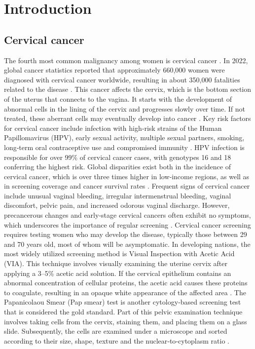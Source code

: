 \documentclass[final,5p,times,twocolumn,authoryear]{elsarticle}
\begin{document}
\section{Introduction}
\subsection{Cervical cancer}
The fourth most common malignancy among women is cervical cancer \cite{ref1}. In 2022, global cancer statistics reported that approximately 660,000 women were diagnosed with cervical cancer worldwide, resulting in about 350,000 fatalities related to the disease \cite{ref2}. This cancer affects the cervix, which is the bottom section of the uterus that connects to the vagina. It starts with the development of abnormal cells in the lining of the cervix and progresses slowly over time. If not treated, these aberrant cells may eventually develop into cancer \cite{ref3}. Key risk factors for cervical cancer include infection with high‑risk strains of the Human Papillomavirus (HPV), early sexual activity, multiple sexual partners, smoking, long‑term oral contraceptive use and compromised immunity \cite{ref4}. HPV infection is responsible for over 99\% of cervical cancer cases, with genotypes 16 and 18 conferring the highest risk. Global disparities exist both in the incidence of cervical cancer, which is over three times higher in low‑income regions, as well as in screening coverage and cancer survival rates \cite{ref5}. Frequent signs of cervical cancer include unusual vaginal bleeding, irregular intermenstrual bleeding, vaginal discomfort, pelvic pain, and increased odorous vaginal discharge. However, precancerous changes and early‑stage cervical cancers often exhibit no symptoms, which underscores the importance of regular screening \cite{ref6}.
Cervical cancer screening requires testing women who may develop the disease, typically those between 29 and 70 years old, most of whom will be asymptomatic. In developing nations, the most widely utilized screening method is Visual Inspection with Acetic Acid (VIA). This technique involves visually examining the uterine cervix after applying a 3–5\% acetic acid solution. If the cervical epithelium contains an abnormal concentration of cellular proteins, the acetic acid causes these proteins to coagulate, resulting in an opaque white appearance of the affected area \cite{ref7}. The Papanicolaou Smear (Pap smear) test is another cytology‑based screening test that is considered the gold standard. Part of this pelvic examination technique involves taking cells from the cervix, staining them, and placing them on a glass slide. Subsequently, the cells are examined under a microscope and sorted according to their size, shape, texture and the nuclear‑to‑cytoplasm ratio \cite{ref8}.
\end{document}
